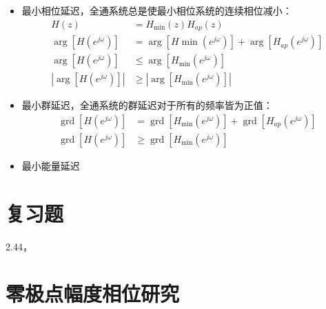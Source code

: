 \documentclass[cn,11pt,chinese,black,simple]{elegantbook}
\begin{document}
\begin{itemize}
    \item 最小相位延迟，全通系统总是使最小相位系统的连续相位减小：\[
        \begin{aligned}
            H(z)&=H_{\min }(z) H_{a p}(z)\\ 
            \arg \left[H\left(e^{j \omega}\right)\right]&=\arg \left[H \min \left(e^{j \omega}\right)\right]+\arg \left[H_{a p}\left(e^{j \omega}\right)\right] \\
            \arg \left[H\left(e^{j \omega}\right)\right] &\leq \arg \left[H_{\min }\left(e^{j \omega}\right)\right] \\
            \left|\arg \left[H\left(e^{j \omega}\right)\right]\right| &\geq\left|\arg \left[H_{\min }\left(e^{j \omega}\right)\right]\right| 
        \end{aligned}
        \]
    \item 最小群延迟，全通系统的群延迟对于所有的频率皆为正值：\[
    \begin{aligned}
        \operatorname{grd}\left[H\left(e^{j \omega}\right)\right]&=\operatorname{grd}\left[H_{\min }\left(e^{j \omega}\right)\right]+\operatorname{grd}\left[H_{a p}\left(e^{j \omega}\right)\right]\\
        \operatorname{grd}\left[H\left(e^{j \omega}\right)\right] &\geq \operatorname{grd}\left[H_{\min }\left(e^{j \omega}\right)\right]
    \end{aligned}
        \]
    \item 最小能量延迟
\end{itemize}

\chapter{复习题}

2.44，

\appendix

\chapter{零极点幅度相位研究}



\let\chapname\undefined
\ifx\mainclass\undefined
\end{document}
